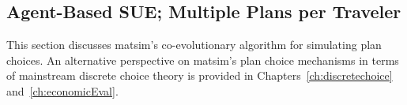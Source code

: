 

\subsection{Agent-Based SUE; Multiple Plans per Traveler}
\label{sec:agent-based-sue}

This section discusses \gls{matsim}'s co-evolutionary algorithm for simulating
plan choices. An alternative perspective on \gls{matsim}'s plan choice mechanisms
in terms of mainstream discrete choice theory \citep{ben-akiva-1985} is
provided in Chapters~\ref{ch:discretechoice} and~\ref{ch:economicEval}.

% 

